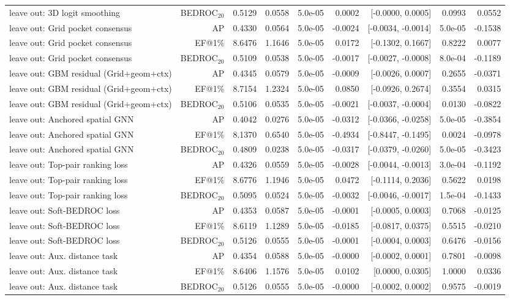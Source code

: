 \begin{table}[t]
\begin{tabular}{lrrrrrrrr}
leave out: 3D logit smoothing & BEDROC$_{20}$ & 0.5129 & 0.0558 & 5.0e-05 & 0.0002 & [-0.0000, 0.0005] & 0.0993 & 0.0552 \\
leave out: Grid pocket consensus & AP & 0.4330 & 0.0564 & 5.0e-05 & -0.0024 & [-0.0034, -0.0014] & 5.0e-05 & -0.1538 \\
leave out: Grid pocket consensus & EF@1\% & 8.6476 & 1.1646 & 5.0e-05 & 0.0172 & [-0.1302, 0.1667] & 0.8222 & 0.0077 \\
leave out: Grid pocket consensus & BEDROC$_{20}$ & 0.5109 & 0.0538 & 5.0e-05 & -0.0017 & [-0.0027, -0.0008] & 8.0e-04 & -0.1189 \\
leave out: GBM residual (Grid+geom+ctx) & AP & 0.4345 & 0.0579 & 5.0e-05 & -0.0009 & [-0.0026, 0.0007] & 0.2655 & -0.0371 \\
leave out: GBM residual (Grid+geom+ctx) & EF@1\% & 8.7154 & 1.2324 & 5.0e-05 & 0.0850 & [-0.0926, 0.2674] & 0.3554 & 0.0315 \\
leave out: GBM residual (Grid+geom+ctx) & BEDROC$_{20}$ & 0.5106 & 0.0535 & 5.0e-05 & -0.0021 & [-0.0037, -0.0004] & 0.0130 & -0.0822 \\
leave out: Anchored spatial GNN & AP & 0.4042 & 0.0276 & 5.0e-05 & -0.0312 & [-0.0366, -0.0258] & 5.0e-05 & -0.3854 \\
leave out: Anchored spatial GNN & EF@1\% & 8.1370 & 0.6540 & 5.0e-05 & -0.4934 & [-0.8447, -0.1495] & 0.0024 & -0.0978 \\
leave out: Anchored spatial GNN & BEDROC$_{20}$ & 0.4809 & 0.0238 & 5.0e-05 & -0.0317 & [-0.0379, -0.0260] & 5.0e-05 & -0.3423 \\
leave out: Top-pair ranking loss & AP & 0.4326 & 0.0559 & 5.0e-05 & -0.0028 & [-0.0044, -0.0013] & 3.0e-04 & -0.1192 \\
leave out: Top-pair ranking loss & EF@1\% & 8.6776 & 1.1946 & 5.0e-05 & 0.0472 & [-0.1114, 0.2036] & 0.5622 & 0.0198 \\
leave out: Top-pair ranking loss & BEDROC$_{20}$ & 0.5095 & 0.0524 & 5.0e-05 & -0.0032 & [-0.0046, -0.0017] & 1.5e-04 & -0.1433 \\
leave out: Soft-BEDROC loss & AP & 0.4353 & 0.0587 & 5.0e-05 & -0.0001 & [-0.0005, 0.0003] & 0.7068 & -0.0125 \\
leave out: Soft-BEDROC loss & EF@1\% & 8.6119 & 1.1289 & 5.0e-05 & -0.0185 & [-0.0817, 0.0375] & 0.5515 & -0.0210 \\
leave out: Soft-BEDROC loss & BEDROC$_{20}$ & 0.5126 & 0.0555 & 5.0e-05 & -0.0001 & [-0.0004, 0.0003] & 0.6476 & -0.0156 \\
leave out: Aux. distance task & AP & 0.4354 & 0.0588 & 5.0e-05 & -0.0000 & [-0.0002, 0.0001] & 0.7801 & -0.0098 \\
leave out: Aux. distance task & EF@1\% & 8.6406 & 1.1576 & 5.0e-05 & 0.0102 & [0.0000, 0.0305] & 1.0000 & 0.0336 \\
leave out: Aux. distance task & BEDROC$_{20}$ & 0.5126 & 0.0555 & 5.0e-05 & -0.0000 & [-0.0002, 0.0002] & 0.9575 & -0.0019 \\
\bottomrule
\end{tabular}
\end{table}
